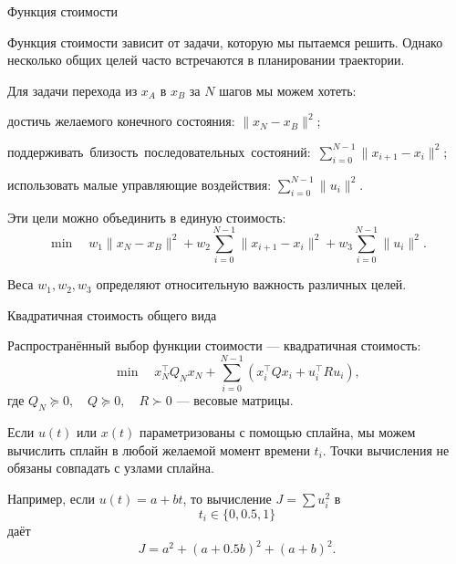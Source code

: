 \documentclass{beamer}
\begin{document}
	
	\begin{frame}{Функция стоимости}
		\begin{flushleft}
			
			{\small 
			Функция стоимости зависит от задачи, которую мы пытаемся
			решить. Однако несколько общих целей часто встречаются
			в планировании траектории.
			
			\vspace{0.5em}
			
			Для задачи перехода из $x_A$ в $x_B$ за $N$ шагов
			мы можем хотеть:
			
			\textbullet  достичь желаемого конечного состояния: $\|x_N-x_B\|^2$;
			
			\textbullet  \mbox{поддерживать близость последовательных состояний: $\sum\limits_{i=0}^{N-1}\|x_{i+1}-x_i\|^2$;}
			
			\textbullet  использовать малые управляющие воздействия: $\sum_{i=0}^{N-1}\|u_i\|^2$.
			
			\bigskip
			
			Эти цели можно объединить в единую стоимость:
			\[
			\min
			\quad
			w_1\|x_N-x_B\|^2
			+
			w_2\sum_{i=0}^{N-1}\|x_{i+1}-x_i\|^2
			+
			w_3\sum_{i=0}^{N-1}\|u_i\|^2.
			\]
			
			Веса $w_1,w_2,w_3$ определяют относительную
			важность различных целей.
		}
		\end{flushleft}
	\end{frame}
	
	
	\begin{frame}{Квадратичная стоимость общего вида}
		\begin{flushleft}
			Распространённый выбор функции стоимости --- квадратичная стоимость:
			\[
			\min
			\quad
			x_N^\top Q_N x_N
			+
			\sum_{i=0}^{N-1}
			\left(
			x_i^\top Q x_i
			+
			u_i^\top R u_i
			\right),
			\]
			где $Q_N\succeq 0,
			\quad
			Q\succeq 0,
			\quad
			R\succ 0$
			--- весовые матрицы.
			
			\vspace{0.5em}
			
			Если $u(t)$ или $x(t)$ параметризованы с помощью сплайна,
			мы можем вычислить сплайн в любой желаемой момент времени $t_i$. Точки вычисления не обязаны совпадать
			с узлами сплайна.
			
			\vspace{0.5em}
			
			Например, если $u(t)=a+bt$,
			то вычисление $J = \sum u_i^2$ в
			\[
			t_i\in\{0,0.5,1\}
			\]
			даёт
			\[
			J
			=
			a^2
			+
			(a+0.5b)^2
			+
			(a+b)^2.
			\]
		\end{flushleft}
	\end{frame}
	
\end{document}
